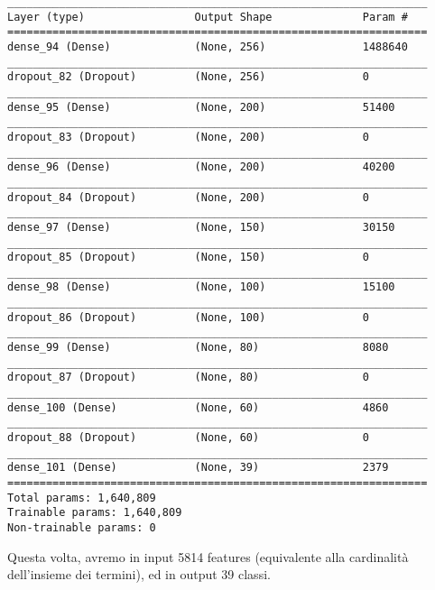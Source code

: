 \begin{verbatim}
_________________________________________________________________
Layer (type)                 Output Shape              Param #   
=================================================================
dense_94 (Dense)             (None, 256)               1488640   
_________________________________________________________________
dropout_82 (Dropout)         (None, 256)               0         
_________________________________________________________________
dense_95 (Dense)             (None, 200)               51400     
_________________________________________________________________
dropout_83 (Dropout)         (None, 200)               0         
_________________________________________________________________
dense_96 (Dense)             (None, 200)               40200     
_________________________________________________________________
dropout_84 (Dropout)         (None, 200)               0         
_________________________________________________________________
dense_97 (Dense)             (None, 150)               30150     
_________________________________________________________________
dropout_85 (Dropout)         (None, 150)               0         
_________________________________________________________________
dense_98 (Dense)             (None, 100)               15100     
_________________________________________________________________
dropout_86 (Dropout)         (None, 100)               0         
_________________________________________________________________
dense_99 (Dense)             (None, 80)                8080      
_________________________________________________________________
dropout_87 (Dropout)         (None, 80)                0         
_________________________________________________________________
dense_100 (Dense)            (None, 60)                4860      
_________________________________________________________________
dropout_88 (Dropout)         (None, 60)                0         
_________________________________________________________________
dense_101 (Dense)            (None, 39)                2379      
=================================================================
Total params: 1,640,809
Trainable params: 1,640,809
Non-trainable params: 0
\end{verbatim}
Questa volta, avremo in input 5814 features (equivalente alla cardinalità dell'insieme dei termini), ed in output 39 classi.
